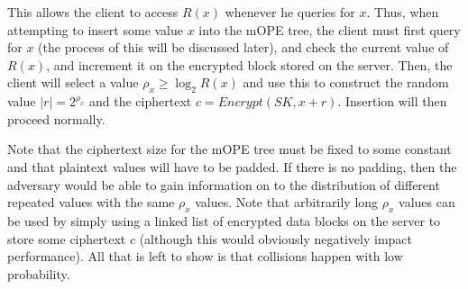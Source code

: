 \documentclass[12pt]{article}
\begin{document}
This allows the client to access $R(x)$ whenever he queries for $x$. Thus, when attempting to insert some value $x$ into the mOPE tree, the client must first query for $x$ (the process of this will be discussed later), and check the current value of $R(x)$, and increment it on the encrypted block stored on the server. Then, the client will select a value $\rho_x \geq \log_2 R(x)$ and use this to construct the random value $|r| = 2^{\rho_x}$ and the ciphertext $c = Encrypt(SK, x + r)$. Insertion will then proceed normally.

Note that the ciphertext size for the mOPE tree must be fixed to some constant and that plaintext values will have to be padded. If there is no padding, then the adversary would be able to gain information on to the distribution of different repeated values with the same $\rho_x$ values. Note that arbitrarily long $\rho_x$ values can be used by simply using a linked list of encrypted data blocks on the server to store some ciphertext $c$ (although this would obviously negatively impact performance). All that is left to show is that collisions happen with low probability. \\
\end{document}
